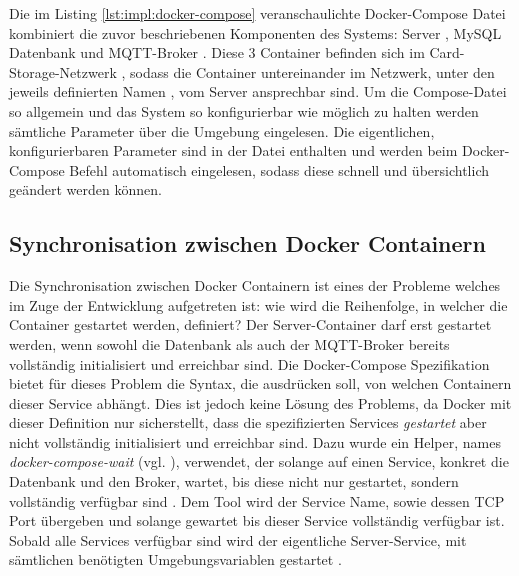 Die im Listing \ref{lst:impl:docker-compose} veranschaulichte Docker-Compose Datei kombiniert die zuvor beschriebenen Komponenten des Systems: Server  , MySQL Datenbank  und MQTT-Broker . Diese 3 Container befinden sich im Card-Storage-Netzwerk , sodass die Container untereinander im Netzwerk, unter den jeweils definierten Namen ,  vom Server  ansprechbar sind. Um die Compose-Datei so allgemein und das System so konfigurierbar wie möglich zu halten werden sämtliche Parameter über die Umgebung  eingelesen. Die eigentlichen, konfigurierbaren Parameter sind in der  Datei enthalten und werden beim Docker-Compose Befehl automatisch eingelesen, sodass diese schnell und übersichtlich geändert werden können.

\subsection{Synchronisation zwischen Docker Containern}
Die Synchronisation zwischen Docker Containern ist eines der Probleme welches im Zuge der Entwicklung aufgetreten ist: wie wird die Reihenfolge, in welcher die Container gestartet werden, definiert? Der Server-Container darf erst gestartet werden, wenn sowohl die Datenbank als auch der MQTT-Broker bereits vollständig initialisiert und erreichbar sind. Die Docker-Compose Spezifikation bietet für dieses Problem die   Syntax, die ausdrücken soll, von welchen Containern dieser Service abhängt. Dies ist jedoch keine Lösung des Problems, da Docker mit dieser Definition nur sicherstellt, dass die spezifizierten Services \textit{gestartet} aber nicht vollständig initialisiert und erreichbar sind. Dazu wurde ein Helper, names \textit{docker-compose-wait} (vgl. \cite{impl:docker-compose:3}), verwendet, der solange auf einen Service, konkret die Datenbank und den Broker, wartet, bis diese nicht nur gestartet, sondern vollständig verfügbar sind . Dem Tool wird der Service Name, sowie dessen TCP Port übergeben und solange gewartet bis dieser Service vollständig verfügbar ist. Sobald alle Services verfügbar sind wird der eigentliche Server-Service, mit sämtlichen benötigten Umgebungsvariablen  gestartet . 